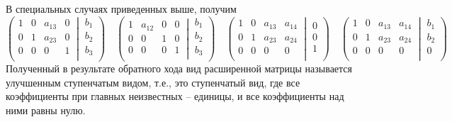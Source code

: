 В специальных случаях приведенных выше, получим
\[
\left(\left.
\begin{matrix}
1& 0&a_{13}& 0\\
0& 1&a_{23}& 0\\
0& 0&0&1\\
\end{matrix}
\:\right|\:
\begin{matrix}
b_1\\
b_2\\
b_3\\
\end{matrix}
\right)
\quad
\left(\left.
\begin{matrix}
1& a_{12}&0& 0\\
0& 0&1& 0\\
0& 0&0&1\\
\end{matrix}
\:\right|\:
\begin{matrix}
b_1\\
b_2\\
b_3\\
\end{matrix}
\right)
\quad
\left(\left.
\begin{matrix}
1& 0&a_{13}& a_{14}\\
0&1&a_{23}& a_{24}\\
0& 0&0& 0\\
\end{matrix}
\:\right|\:
\begin{matrix}
0\\
0\\
1\\
\end{matrix}
\right)
\quad
\left(\left.
\begin{matrix}
1&0&a_{13}& a_{14}\\
0& 1&a_{23}& a_{24}\\
0& 0&0& 0\\
\end{matrix}
\:\right|\:
\begin{matrix}
b_1\\
b_2\\
0\\
\end{matrix}
\right)
\]
Полученный в результате обратного хода вид расширенной матрицы называется улучшенным ступенчатым видом, т.е., это ступенчатый вид, где все коэффициенты при главных неизвестных -- единицы, и все коэффициенты над ними равны нулю.


